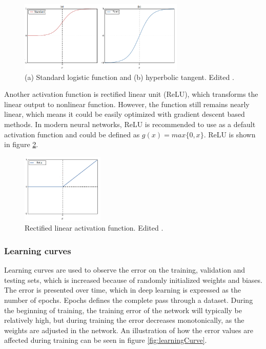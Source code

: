 \begin{figure} [H]
\centering
\includegraphics[width=0.7\textwidth]{figures/Sigmoids}
\caption{(a) Standard logistic function and (b) hyperbolic tangent. Edited \citep{Bengio2012}.}
\label{fig:Sigmoids}
\end{figure}

\noindent
Another activation function is rectified linear unit (ReLU), which transforms the linear output to nonlinear function. However, the function still remains nearly linear, which means it could be easily optimized with gradient descent based methods\citep{Goodfellow2016}. In modern neural networks, ReLU is recommended to use as a default activation function and could be defined as $g(x) = max\{0, x\}$. ReLU is shown in figure \ref{fig:Relu}.

\begin{figure} [H]
\centering
\includegraphics[width=0.35\textwidth]{figures/Relu}
\caption{Rectified linear activation function.
Edited \citep{Goodfellow2016}.}
\label{fig:Relu}
\end{figure}

\subsubsection{Learning curves}
Learning curves are used to observe the error on the training, validation and testing sets, which is increased because of randomly initialized weights and biases. The error is presented over time, which in deep learning is expressed as the number of epochs. Epochs defines the complete pass through a dataset.
During the beginning of training, the training error of the network will typically be relatively high, but during training the error decreases monotonically, as the weights are adjusted in the network.\citep{Duda2000} An illustration of how the error values are affected during training can be seen in figure \ref{fig:learningCurve}.

